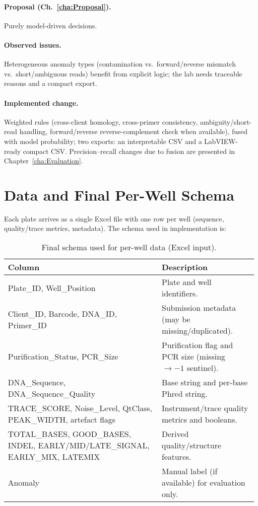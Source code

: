 \paragraph{Proposal (Ch.~\ref{cha:Proposal}).}
Purely model-driven decisions.

\paragraph{Observed issues.}
Heterogeneous anomaly types (contamination vs.\ forward/reverse mismatch vs.\ short/ambiguous reads) benefit from explicit logic; the lab needs traceable reasons and a compact export.

\paragraph{Implemented change.}
Weighted rules (cross-client homology, cross-primer consistency, ambiguity/short-read handling, forward/reverse reverse-complement check when available), fused with model probability; two exports: an interpretable CSV and a LabVIEW-ready compact CSV. Precision–recall changes due to fusion are presented in Chapter~\ref{cha:Evaluation}.

\section{Data and Final Per-Well Schema}
\label{sec:data_schema}
Each plate arrives as a single Excel file with one row per well (sequence, quality/trace metrics, metadata). The schema used in implementation is:

\begin{table}[H]
  \centering
  \caption{Final schema used for per-well data (Excel input).}
  \label{tab:final_table_schema_impl}
  \begin{tabular}{|l|p{11cm}|}
    \hline
    \textbf{Column} & \textbf{Description} \\ \hline
    Plate\_ID, Well\_Position & Plate and well identifiers. \\ \hline
    Client\_ID, Barcode, DNA\_ID, Primer\_ID & Submission metadata (may be missing/duplicated). \\ \hline
    Purification\_Status, PCR\_Size & Purification flag and PCR size (missing $\rightarrow -1$ sentinel). \\ \hline
    DNA\_Sequence, DNA\_Sequence\_Quality & Base string and per-base Phred string. \\ \hline
    TRACE\_SCORE, Noise\_Level, QtClass, PEAK\_WIDTH, artefact flags & Instrument/trace quality metrics and booleans. \\ \hline
    TOTAL\_BASES, GOOD\_BASES, INDEL, EARLY/MID/LATE\_SIGNAL, EARLY\_MIX, LATEMIX & Derived quality/structure features. \\ \hline
    Anomaly & Manual label (if available) for evaluation only. \\ \hline
  \end{tabular}
\end{table}

